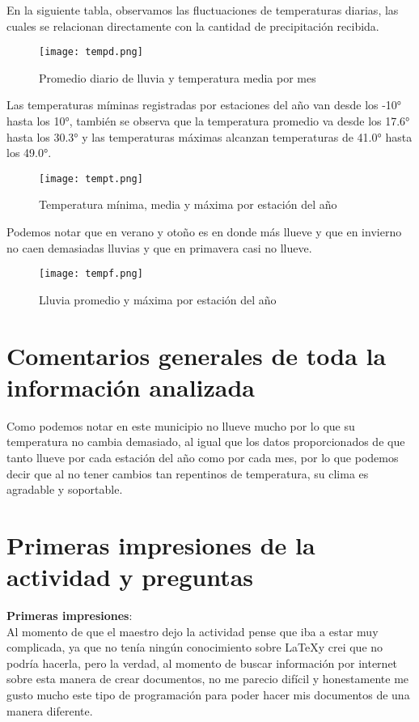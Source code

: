 \documentclass{article}
\begin{document}
\clearpage

En la siguiente tabla, observamos las fluctuaciones de temperaturas diarias, las cuales se relacionan directamente con la cantidad de precipitación recibida. 

\begin{figure}[H]
    \centering
    \texttt{[image: tempd.png]} 
    \caption{Promedio diario de lluvia y temperatura media por mes} 
\end{figure}

Las temperaturas míminas registradas por estaciones del año van desde los -10° hasta los 10°, también se observa que la temperatura promedio va desde los 17.6° hasta los 30.3° y las temperaturas máximas alcanzan temperaturas de 41.0° hasta los 49.0°.

\begin{figure}[H]
    \centering
    \texttt{[image: tempt.png]} 
    \caption{Temperatura mínima, media y máxima por estación del año } 
\end{figure}

\clearpage

Podemos notar que en verano y otoño es en donde más llueve y que en invierno no caen demasiadas lluvias y que en primavera casi no llueve.

\begin{figure}[H]
    \centering
    \texttt{[image: tempf.png]} 
    \caption{Lluvia promedio y máxima por estación del año} 
\end{figure}

\section{Comentarios generales de toda la información analizada}
Como podemos notar en este municipio no llueve mucho por lo que su temperatura no cambia demasiado, al igual que los datos proporcionados de que tanto llueve por cada estación del año como por cada mes, por lo que podemos decir que al no tener cambios tan repentinos de temperatura, su clima es agradable y soportable.


\section{Primeras impresiones de la actividad y preguntas}
\textbf{Primeras impresiones}:\\
Al momento de que el maestro dejo la actividad pense que iba a estar muy complicada, ya que no tenía ningún conocimiento sobre \LaTeX y crei que no podría hacerla, pero la verdad, al momento de buscar información por internet sobre esta manera de crear documentos, no me parecio difícil y honestamente me gusto mucho este tipo de programación para poder hacer mis documentos de una manera diferente.\\
\end{document}
